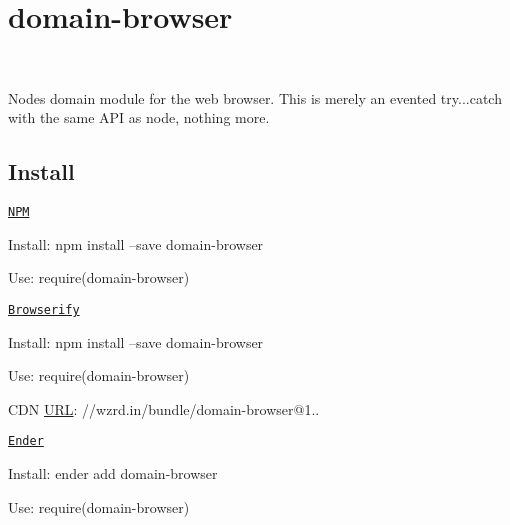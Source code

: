 \section*{domain-\/browser}

\href{http://travis-ci.org/bevry/domain-browser}{\tt } \href{https://npmjs.org/package/domain-browser}{\tt } \href{https://npmjs.org/package/domain-browser}{\tt } \href{https://david-dm.org/bevry/domain-browser}{\tt } \href{https://david-dm.org/bevry/domain-browser#info=devDependencies}{\tt } ~\newline
 \href{https://slack.bevry.me}{\tt } \href{http://patreon.com/bevry}{\tt } \href{https://www.gratipay.com/bevry}{\tt } \href{http://flattr.com/thing/344188/balupton-on-Flattr}{\tt } \href{https://www.paypal.com/cgi-bin/webscr?cmd=_s-xclick&amp;hosted_button_id=QB8GQPZAH84N6}{\tt } \href{https://bevry.me/bitcoin}{\tt } \href{https://bevry.me/wishlist}{\tt }

Node\textquotesingle{}s domain module for the web browser. This is merely an evented try...catch with the same A\+PI as node, nothing more.

\subsection*{Install}

\href{https://npmjs.com}{\tt N\+PM}
\begin{DoxyItemize}
\item Install\+: {\ttfamily npm install --save domain-\/browser} 
\item Use\+: {\ttfamily require(\textquotesingle{}domain-\/browser\textquotesingle{})}
\end{DoxyItemize}

\href{http://browserify.org}{\tt Browserify}
\begin{DoxyItemize}
\item Install\+: {\ttfamily npm install --save domain-\/browser} 
\item Use\+: {\ttfamily require(\textquotesingle{}domain-\/browser\textquotesingle{})} 
\item C\+DN \mbox{\hyperlink{namespace_u_r_l}{U\+RL}}\+: {\ttfamily //wzrd.in/bundle/domain-\/browser@1..}
\end{DoxyItemize}

\href{http://enderjs.com}{\tt Ender}
\begin{DoxyItemize}
\item Install\+: {\ttfamily ender add domain-\/browser} 
\item Use\+: {\ttfamily require(\textquotesingle{}domain-\/browser\textquotesingle{})}
\end{DoxyItemize}

